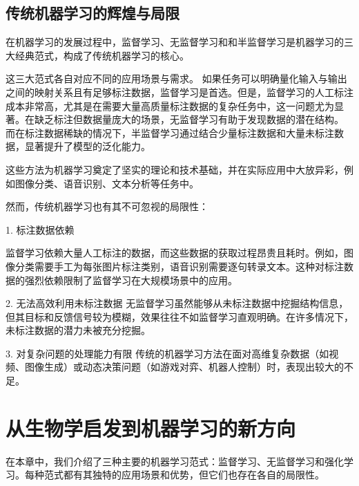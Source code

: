 \subsection{传统机器学习的辉煌与局限}
在机器学习的发展过程中，监督学习、无监督学习和和半监督学习是机器学习的三大经典范式，构成了传统机器学习的核心。

这三大范式各自对应不同的应用场景与需求。
如果任务可以明确量化输入与输出之间的映射关系且有足够标注数据，监督学习是首选。但是，监督学习的人工标注成本非常高，尤其是在需要大量高质量标注数据的复杂任务中，这一问题尤为显著。在缺乏标注但数据量庞大的场景，无监督学习有助于发现数据的潜在结构。
而在标注数据稀缺的情况下，半监督学习通过结合少量标注数据和大量未标注数据，显著提升了模型的泛化能力。

这些方法为机器学习奠定了坚实的理论和技术基础，并在实际应用中大放异彩，例如图像分类、语音识别、文本分析等任务中。

然而，传统机器学习也有其不可忽视的局限性：

1. 标注数据依赖

监督学习依赖大量人工标注的数据，而这些数据的获取过程昂贵且耗时。例如，图像分类需要手工为每张图片标注类别，语音识别需要逐句转录文本。这种对标注数据的强烈依赖限制了监督学习在大规模场景中的应用。

2. 无法高效利用未标注数据
无监督学习虽然能够从未标注数据中挖掘结构信息，但其目标和反馈信号较为模糊，效果往往不如监督学习直观明确。在许多情况下，未标注数据的潜力未被充分挖掘。

3. 对复杂问题的处理能力有限
传统的机器学习方法在面对高维复杂数据（如视频、图像生成）或动态决策问题（如游戏对弈、机器人控制）时，表现出较大的不足。

\section{从生物学启发到机器学习的新方向}
在本章中，我们介绍了三种主要的机器学习范式：监督学习、无监督学习和强化学习。每种范式都有其独特的应用场景和优势，但它们也存在各自的局限性。

